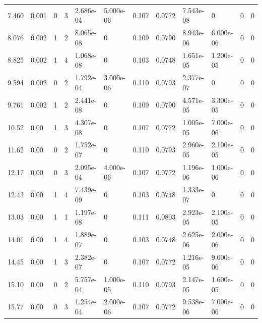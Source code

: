 \documentclass[preview]{standalone}
\begin{document}
{{\begin{tabular}{L{1.2cm}C{1.2cm} C{0.3cm}C{0.5cm} C{1.4cm}C{1.4cm} C{1.4cm}C{1.4cm} C{1.6cm}C{1.6cm} C{1.6cm}C{1.6cm}}
  7.460  &  0.001  & 0     &  3 &  2.686e-04  & 5.000e-06  &  0.107&   0.0772& 7.543e-08 & 0   &  0 & 0  \\ 
  8.076  &  0.002  & 1     &  2 &  8.065e-08  & 0  &  0.109&   0.0790& 8.943e-06 & 6.000e-06   &  0 & 0  \\ 
  8.825  &  0.002  & 1     &  4 &  1.068e-08  & 0  &  0.103&   0.0748& 1.651e-05 & 1.200e-05   &  0 & 0  \\ 
  9.594  &  0.002  & 0     &  2 &  1.792e-04  & 3.000e-06  &  0.110&   0.0793& 2.377e-07 & 0   &  0 & 0  \\ 
  9.761  &  0.002  & 1     &  2 &  2.441e-08  & 0  &  0.109&   0.0790& 4.571e-05 & 3.300e-05   &  0 & 0  \\ 
  10.52  &  0.00  & 1     &  3 &  4.307e-08  & 0  &  0.107&   0.0772& 1.005e-05 & 7.000e-06   &  0 & 0  \\ 
  11.62  &  0.00  & 0     &  2 &  1.752e-07  & 0  &  0.110&   0.0793& 2.960e-05 & 2.100e-05   &  0 & 0  \\ 
  12.17  &  0.00  & 0     &  3 &  2.095e-04  & 4.000e-06  &  0.107&   0.0772& 1.196e-06 & 1.000e-06   &  0 & 0  \\ 
  12.43  &  0.00  & 1     &  4 &  7.439e-09  & 0  &  0.103&   0.0748& 1.333e-07 & 0   &  0 & 0  \\ 
  13.03  &  0.00  & 1     &  1 &  1.197e-08  & 0  &  0.111&   0.0803& 2.923e-05 & 2.100e-05   &  0 & 0  \\ 
  14.01  &  0.00  & 1     &  4 &  1.889e-07  & 0  &  0.103&   0.0748& 2.625e-06 & 2.000e-06   &  0 & 0  \\ 
  14.45  &  0.00  & 1     &  3 &  2.382e-07  & 0  &  0.107&   0.0772& 1.216e-05 & 9.000e-06   &  0 & 0  \\ 
  15.10  &  0.00  & 0     &  2 &  5.757e-04  & 1.000e-05  &  0.110&   0.0793& 2.147e-05 & 1.600e-05   &  0 & 0  \\ 
  15.77  &  0.00  & 0     &  3 &  1.254e-04  & 2.000e-06  &  0.107&   0.0772& 9.538e-06 & 7.000e-06   &  0 & 0  \\ 
\hline 
\end{tabular} 

}}
\end{document}
